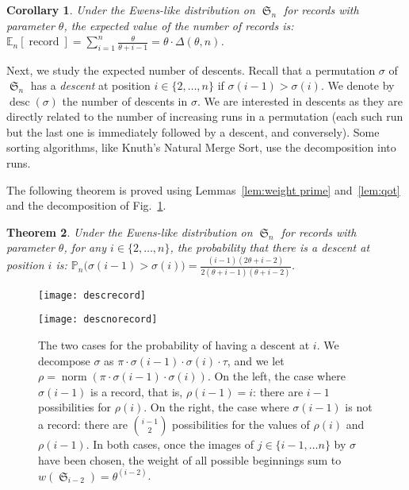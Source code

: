 \documentclass[proceedings]{aofa}
\newcommand{\EE}{\mathbb{E}}
\newcommand{\PP}{\mathbb{P}}
\DeclareMathOperator{\sym}{\mathfrak{S}}
\DeclareMathOperator{\rec}{record}
\DeclareMathOperator{\norm}{norm}
\DeclareMathOperator{\desc}{desc}
\newcommand{\rfact}[2]{#1^{(#2)}}
\newtheorem{theorem}{Theorem}
\newtheorem{corollary}[theorem]{Corollary}
\begin{document}
\begin{corollary} \label{thm:nb_of_records}
Under the Ewens-like distribution on $\sym_n$ for records with parameter $\theta$, the expected value of the number of records is: 
$\EE_{n}[\rec] = \sum_{i=1}^{n}\frac{\theta}{\theta + i-1} = \theta \cdot\Delta(\theta,n)$.
\end{corollary}

\medskip

Next, we study the expected number of descents. 
Recall that a permutation $\sigma$ of $\sym_{n}$ has a \emph{descent} at position $i\in\{2,\ldots,n\}$ if
$\sigma(i-1)>\sigma(i)$. We denote by $\desc(\sigma)$ the number of descents in $\sigma$. 
We are interested in descents as they are directly related to the number of increasing runs in a permutation 
(each such run but the last one is immediately followed by a descent, and conversely). 
Some sorting algorithms, like Knuth's Natural Merge Sort, use the decomposition into runs.

The following theorem is proved using Lemmas~\ref{lem:weight prime} and~\ref{lem:qot} and the decomposition of Fig.~\ref{fig:desc}.
\begin{theorem}\label{lem:descent i}
Under the Ewens-like distribution on $\sym_n$ for records with parameter $\theta$, 
for any $i\in\{2,\ldots,n\}$, 
the probability that there is a descent at position $i$ is: 
$\PP_{n}\big(\sigma(i-1)>\sigma(i)\big) =   \frac{(i-1)(2\theta  +  i-2)}{2(\theta + i-1)(\theta + i-2)}$. 
\end{theorem}
\begin{figure}[ht]
\begin{minipage}{.49\textwidth}
\texttt{[image: descrecord]}
\end{minipage}
\begin{minipage}{.49\textwidth}
\texttt{[image: descnorecord]}
\end{minipage}
\caption{The two cases for the probability of having a descent at $i$. 
We decompose $\sigma$ as $\pi \cdot \sigma(i-1) \cdot \sigma(i) \cdot \tau$, and we let $\rho=\norm(\pi \cdot \sigma(i-1) \cdot \sigma(i))$.
On the left, the case where $\sigma(i-1)$ is a record, that is, $\rho(i-1)=i$: there are $i-1$ possibilities for $\rho(i)$. 
On the right, the case where $\sigma(i-1)$ is not a record: there are $\binom{i-1}{2}$ possibilities for the values of $\rho(i)$ and $\rho(i-1)$. 
In both cases, once the images of $j\in\{i-1,\ldots n\}$ by $\sigma$ have been chosen, the weight of all possible beginnings sum to $w(\sym_{i-2})=\rfact\theta {i-2}$.\label{fig:desc}}
\end{figure}
\end{document}
